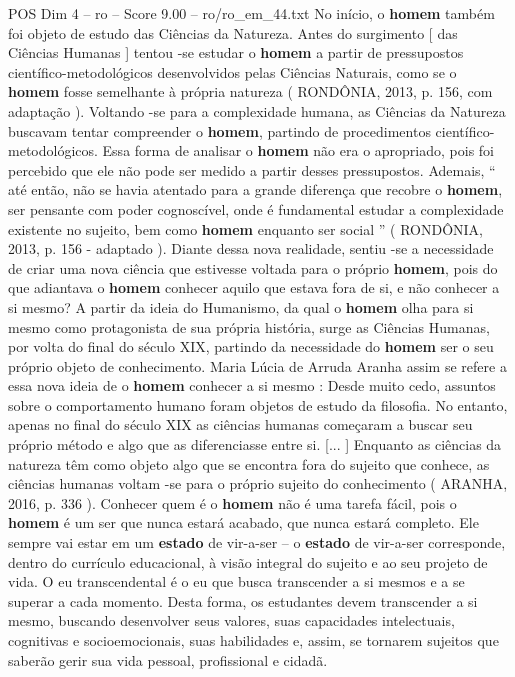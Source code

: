 \begin{textsample}{POS Dim 4 – ro – Score 9.00 – ro/ro\_em\_44.txt}
No início, o \textbf{homem} também foi objeto de estudo das Ciências da Natureza.
Antes do surgimento [ das Ciências Humanas ] tentou -se estudar o \textbf{homem} a partir de pressupostos científico-metodológicos desenvolvidos pelas Ciências Naturais, como se o \textbf{homem} fosse semelhante à própria natureza ( RONDÔNIA, 2013, p. 156, com adaptação ).
Voltando -se para a complexidade humana, as Ciências da Natureza buscavam tentar compreender o \textbf{homem}, partindo de procedimentos científico-metodológicos.
Essa forma de analisar o \textbf{homem} não era o apropriado, pois foi percebido que ele não pode ser medido a partir desses pressupostos.
Ademais, “ até então, não se havia atentado para a grande diferença que recobre o \textbf{homem}, ser pensante com poder cognoscível, onde é fundamental estudar a complexidade existente no sujeito, bem como \textbf{homem} enquanto ser social ” ( RONDÔNIA, 2013, p. 156 - adaptado ).
Diante dessa nova realidade, sentiu -se a necessidade de criar uma nova ciência que estivesse voltada para o próprio \textbf{homem}, pois do que adiantava o \textbf{homem} conhecer aquilo que estava fora de si, e não conhecer a si mesmo?
A partir da ideia do Humanismo, da qual o \textbf{homem} olha para si mesmo como protagonista de sua própria história, surge as Ciências Humanas, por volta do final do século XIX, partindo da necessidade do \textbf{homem} ser o seu próprio objeto de conhecimento.
Maria Lúcia de Arruda Aranha assim se refere a essa nova ideia de o \textbf{homem} conhecer a si mesmo : Desde muito cedo, assuntos sobre o comportamento humano foram objetos de estudo da filosofia.
No entanto, apenas no final do século XIX as ciências humanas começaram a buscar seu próprio método e algo que as diferenciasse entre si. [... ] Enquanto as ciências da natureza têm como objeto algo que se encontra fora do sujeito que conhece, as ciências humanas voltam -se para o próprio sujeito do conhecimento ( ARANHA, 2016, p. 336 ).
Conhecer quem é o \textbf{homem} não é uma tarefa fácil, pois o \textbf{homem} é um ser que nunca estará acabado, que nunca estará completo.
Ele sempre vai estar em um \textbf{estado} de vir-a-ser – o \textbf{estado} de vir-a-ser corresponde, dentro do currículo educacional, à visão integral do sujeito e ao seu projeto de vida.
O eu transcendental é o eu que busca transcender a si mesmos e a se superar a cada momento.
Desta forma, os estudantes devem transcender a si mesmo, buscando desenvolver seus valores, suas capacidades intelectuais, cognitivas e socioemocionais, suas habilidades e, assim, se tornarem sujeitos que saberão gerir sua vida pessoal, profissional e cidadã.

\end{textsample}
